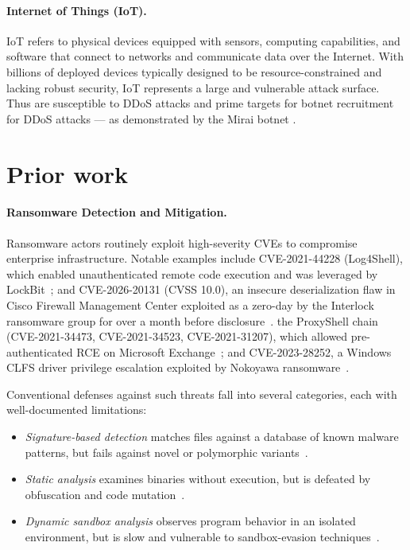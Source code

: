 \documentclass[twocolumn, 10pt]{scrartcl}
\begin{document}
\paragraph{Internet of Things (IoT).} 
IoT refers to physical devices equipped with sensors, computing capabilities, and software that connect to networks and communicate data over the Internet. %
With billions of deployed devices typically designed to be resource-constrained and lacking robust security, IoT represents a large and vulnerable attack surface. Thus are susceptible to DDoS attacks and prime targets for botnet recruitment for DDoS attacks — as demonstrated by the Mirai botnet \cite{antonakakis2017understanding}.

\section{Prior work}
\paragraph{Ransomware Detection and Mitigation.}
Ransomware actors routinely exploit high-severity CVEs to compromise enterprise infrastructure. Notable examples include CVE-2021-44228 (Log4Shell), which enabled unauthenticated remote code execution and was leveraged by LockBit~\cite{cisa_lockbit2023}; and CVE-2026-20131 (CVSS 10.0), an insecure deserialization flaw in Cisco Firewall Management Center exploited as a zero-day by the Interlock ransomware group for over a month before disclosure~\cite{cve2026_20131}.
the ProxyShell chain (CVE-2021-34473, CVE-2021-34523, CVE-2021-31207), which allowed pre-authenticated RCE on Microsoft Exchange~\cite{cisa_topvulns2022}; and CVE-2023-28252, a Windows CLFS driver privilege escalation exploited by Nokoyawa ransomware~\cite{cisa_kev}.

Conventional defenses against such threats fall into several categories, each with well-documented limitations:
\begin{itemize}
    \item \textit{Signature-based detection} matches files against a database of known malware patterns, but fails against novel or polymorphic variants~\cite{ispahany2024}.
    \item \textit{Static analysis} examines binaries without execution, but is defeated by obfuscation and code mutation~\cite{alraizza2023}.
    \item \textit{Dynamic sandbox analysis} observes program behavior in an isolated environment, but is slow and vulnerable to sandbox-evasion techniques~\cite{alraizza2023}.
\end{itemize}
\end{document}
